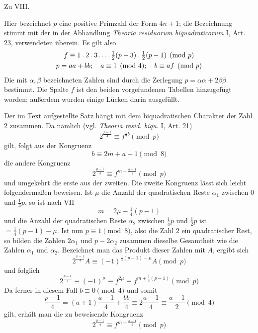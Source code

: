 \begingroup
\setlength{\abovedisplayskip}{7pt plus 1pt minus 1pt}
\setlength{\belowdisplayskip}{7pt plus 1pt minus 1pt}
\setlength{\abovedisplayshortskip}{3pt plus 1pt minus 1pt}
\setlength{\belowdisplayshortskip}{7pt plus 1pt minus 1pt}
\begin{center}\large Zu VIII.\end{center}

Hier bezeichnet $p$ eine positive Primzahl der Form $4n+1$; die Bezeichnung stimmt mit der in der Abhandlung \emph{Theoria residuorum biquadraticorum} I, Art. 23, verwendeten überein. Es gilt also
\[
\begin{gathered}
f\equiv1\mathbin{.}2\mathbin{.}3\mathinner{.\,.\,.\,.}\tfrac12(p-3)\mathbin{.}\tfrac12(p-1)\pmod p\\
p=aa+bb;\quad a\equiv1\pmod4;\quad b\equiv af\pmod p
\end{gathered}
\]
Die mit $\alpha,\beta$ bezeichneten Zahlen sind durch die Zerlegung $p=\alpha\alpha+2\beta\beta$ bestimmt. Die Spalte $f$ ist den beiden vorgefundenen Tabellen hinzugefügt worden; außerdem wurden einige Lücken darin ausgefüllt.

Der im Text aufgestellte Satz hängt mit dem biquadratischen Charakter der Zahl $2$ zusammen. Da nämlich (vgl. \emph{Theoria resid. biqu.} I, Art. 21)
\[
2^{\frac{p-1}4}\equiv f^{\frac12 b}\pmod p
\]
gilt, folgt aus der Kongruenz
\[
b\equiv2m+a-1\pmod8
\]
die andere Kongruenz
\[
2^{\frac{p-1}4}\equiv f^{m+\frac{a-1}2}\pmod p
\]
und umgekehrt die erste aus der zweiten. Die zweite Kongruenz lässt sich leicht folgendermaßen beweisen. Ist $\mu$ die Anzahl der quadratischen Reste $\alpha_1$ zwischen $0$ und $\frac14p$, so ist nach VII
\[
m=2\mu-\tfrac14(p-1)
\]
und die Anzahl der quadratischen Reste $\alpha_2$ zwischen $\frac14p$ und $\frac12p$ ist $=\frac14(p-1)-\mu$. Ist nun $p\equiv1\pmod8$, also die Zahl $2$ ein quadratischer Rest, so bilden die Zahlen $2\alpha_1$ und $p-2\alpha_2$ zusammen dieselbe Gesamtheit wie die Zahlen $\alpha_1$ und $\alpha_2$. Bezeichnet man das Produkt dieser Zahlen mit $A$, ergibt sich
\[
2^{\frac{p-1}4}A\equiv(-1)^{\frac14(p-1)-\mu}A\pmod p
\]
und folglich
\[
2^{\frac{p-1}4}\equiv(-1)^\mu\equiv f^{2\mu}\equiv f^{m+\frac14(p-1)}\pmod p
\]
Da ferner in diesem Fall $b\equiv0\pmod4$ und somit
\[
\frac{p-1}4=(a+1)\frac{a-1}4+\frac{bb}4\equiv2\frac{a-1}4\equiv\frac{a-1}2\pmod4
\]
gilt, erhält man die zu beweisende Kongruenz
\[
2^{\frac{p-1}4}\equiv f^{m+\frac{a-1}2}\pmod p
\]

